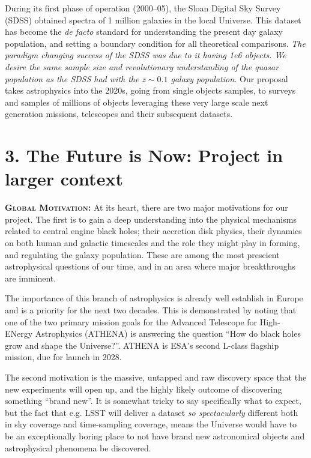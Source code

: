 \documentclass[oneside, a4paper, onecolumn, 11pt]{article}
\begin{document}
\smallskip
\smallskip




\smallskip
\smallskip
\noindent
During its first phase of operation (2000–05), the Sloan Digital Sky
Survey (SDSS) obtained spectra of 1 million galaxies in the local
Universe. This dataset has become the {\it de facto} standard for
understanding the present day galaxy population, and setting a
boundary condition for all theoretical comparisons.
{\it The paradigm changing success of the SDSS was due to it having 1e6 objects. 
We desire the same sample size and revolutionary understanding of the quasar 
population as the SDSS had with the $z\sim0.1$ galaxy population.}
Our proposal takes astrophysics into the 2020s, going from single
objects samples, to surveys and samples of millions of objects
leveraging these very large scale next generation
missions, telescopes and their subsequent datasets.



\section*{\textcolor{Cerulean}{3. The Future is Now: Project in larger context}}
\textbf{\textsc{\textcolor{Cerulean}{Global Motivation:}}}
At its heart, there are two major motivations for our project.  The
first is to gain a deep understanding into the physical mechanisms
related to central engine black holes; their accretion disk physics,
their dynamics on both human and galactic timescales and the role they
might play in forming, and regulating the galaxy population. These are
among the most prescient astrophysical questions of our time, and in
an area where major breakthroughs are imminent.

\smallskip
\smallskip
\noindent
The importance of this branch of astrophysics is already well
establish in Europe and is a priority for the next two decades. This
is demonstrated by noting that one of the two primary mission goals
for the Advanced Telescope for High-ENergy Astrophysics (ATHENA) is
answering the question ``How do black holes grow and shape the
Universe?''.  ATHENA is ESA's second L-class flagship mission, due for
launch in 2028.

\smallskip
\smallskip
\noindent
The second motivation is the massive, untapped and raw discovery space
that the new experiments will open up, and the highly likely outcome
of discovering something ``brand new''. It is somewhat tricky to say
specifically what to expect, but the fact that e.g. LSST will deliver
a dataset {\it so spectacularly} different both in sky coverage and
time-sampling coverage, means the Universe would have to be an
exceptionally boring place to not have brand new astronomical objects
and astrophysical phenomena be discovered.
\end{document}
